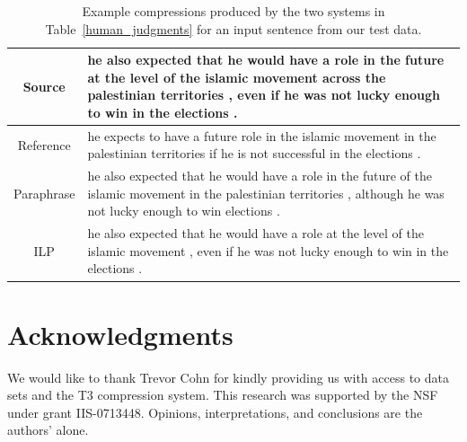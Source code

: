 \documentclass[11pt]{article}
\begin{document}
\begin{table}
\begin{center}
\small
\begin{tabular}{|c|p{13.2cm}|}
  \hline
  Source & he also expected that he would have a role in the future at
  the level of the islamic movement across the palestinian territories
  , even if he was not lucky enough to win in the elections . \\
  \hline
  Reference & he expects to have a future role in the islamic movement
  in the palestinian territories if he is not successful in the
  elections . \\
  \hline
  Paraphrase & he also expected that he would have a role in the future
  of the islamic movement in the palestinian territories , although he
  was not lucky enough to win elections . \\
  \hline
  ILP & he also expected that he would have a role at the level of the
  islamic movement , even if he was not lucky enough to win in the
  elections . \\
  \hline
\end{tabular}
\normalsize
\end{center}
\caption{Example compressions produced by the two systems in
  Table~\ref{human_judgments} for an input sentence from our test
  data.}
\label{test_examples}
\end{table}


\section*{Acknowledgments}
 We would like to thank Trevor Cohn for kindly providing us with
 access to data sets and the T3 compression system.
 This research was supported by the NSF under grant
 IIS-0713448. Opinions, interpretations, and conclusions are the
 authors' alone.



\end{document}
